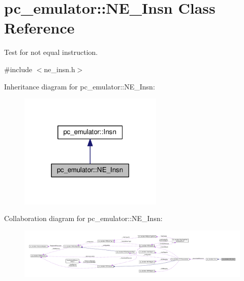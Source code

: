 \hypertarget{classpc__emulator_1_1NE__Insn}{}\section{pc\+\_\+emulator\+:\+:N\+E\+\_\+\+Insn Class Reference}
\label{classpc__emulator_1_1NE__Insn}


Test for not equal instruction.  




{\ttfamily \#include $<$ne\+\_\+insn.\+h$>$}



Inheritance diagram for pc\+\_\+emulator\+:\+:N\+E\+\_\+\+Insn\+:\nopagebreak
\begin{figure}[H]
\begin{center}
\leavevmode
\includegraphics[width=194pt]{classpc__emulator_1_1NE__Insn__inherit__graph}
\end{center}
\end{figure}


Collaboration diagram for pc\+\_\+emulator\+:\+:N\+E\+\_\+\+Insn\+:\nopagebreak
\begin{figure}[H]
\begin{center}
\leavevmode
\includegraphics[width=350pt]{classpc__emulator_1_1NE__Insn__coll__graph}
\end{center}
\end{figure}
